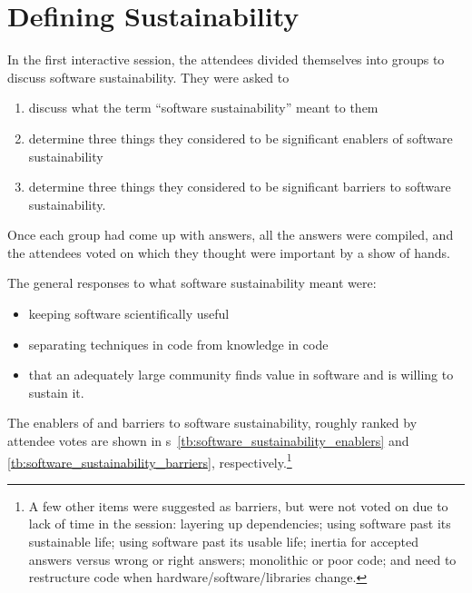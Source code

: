 \documentclass[11pt, oneside]{amsart}
\newcommand{\todo}[1]{{\color{blue}$\blacksquare$~\textsf{[TODO: #1]}}}
\newcommand{\katznote}[1]{ {\textcolor{magenta}    { ***Dan:      #1 }}}
\begin{document}
\smallskip

\section{Defining Sustainability} \label{sec:defining}


In the first interactive session, the attendees divided themselves into groups
to discuss software sustainability. They were asked to
\begin{enumerate}
\item discuss what the term ``software sustainability'' meant to them

\item determine three things they considered to be significant enablers of
software sustainability

\item determine three things they considered to be significant barriers to
software sustainability.
\end{enumerate}
Once each group had come up with answers, all the answers were compiled, and the
attendees voted on which they thought were important by a show of hands.

The general responses to what software sustainability meant were:
\begin{itemize}
\item keeping software scientifically useful
\item separating techniques in code from knowledge in code
\item that an adequately large community finds value in software and is willing
to sustain it.
\end{itemize}

The enablers of and barriers to software sustainability, roughly ranked by
attendee votes are shown in
{\tablename}s~\ref{tb:software_sustainability_enablers} and
\ref{tb:software_sustainability_barriers}, respectively.\footnote{A few other
items were suggested as barriers, but were not voted on due to lack of time in
the session:
layering up dependencies;
using software past its sustainable life;
using software past its usable life;
inertia for accepted answers versus wrong or right answers;
monolithic or poor code; and
need to restructure code when hardware/software/libraries change.
}
\end{document}
